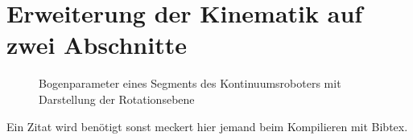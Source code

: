 \section{Erweiterung der Kinematik auf zwei Abschnitte}
\label{sec:erweiterungKinematik}
\lipsum[1]
\begin{wrapfigure}{I}{0.5\textwidth}
\centering
{
   \fontsize{14pt}{11pt}\selectfont%
   
}
%
\caption[Bogenparameter eines Segments des Kontinuumsroboters]{Bogenparameter eines Segments des Kontinuumsroboters mit Darstellung der Rotationsebene}
\end{wrapfigure}

\lipsum[2-3]




\vspace{2cm} Ein Zitat wird benötigt sonst meckert hier jemand \cite{Li17} beim Kompilieren mit Bibtex.
